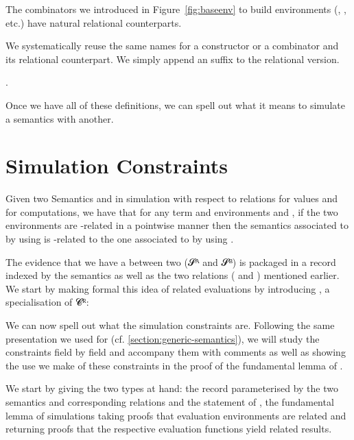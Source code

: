 The combinators we introduced in Figure~\ref{fig:baseenv} to build environments
(, , etc.) have natural relational counterparts.

\begin{convention}
We systematically reuse the same names for a constructor or a combinator and
its relational counterpart. We simply append an  suffix to the relational
version.
\end{convention}.


Once we have all of these definitions, we can spell out what it means to
simulate a semantics with another.

\section{Simulation Constraints}
\label{sec:simconstraints}

Given two Semantics  and  in simulation with respect to
relations  for values and  for computations, we have that
for any term  and environments  and , if the two
environments are -related in a pointwise manner then the semantics
associated to  by  using  is -related to the
one associated to  by  using .

The evidence that we have a  between two 
(𝓢ᴬ and 𝓢ᴮ) is packaged in a record indexed by the semantics as well
as the two relations ( and ) mentioned earlier.
We start by making formal this idea of related evaluations by introducing
, a specialisation of 𝓒ᴿ:


We can now spell out what the simulation constraints are. Following the
same presentation we used for 
(cf. \cref{section:generic-semantics}), we will study the constraints field
by field and accompany them with comments as well as showing the use we make
of these constraints in the proof of the fundamental lemma of .

We start by giving the two types at hand: the  record
parameterised by the two semantics and corresponding relations and
the statement of , the fundamental lemma of simulations
taking proofs that evaluation environments are related and returning
proofs that the respective evaluation functions yield related results.

